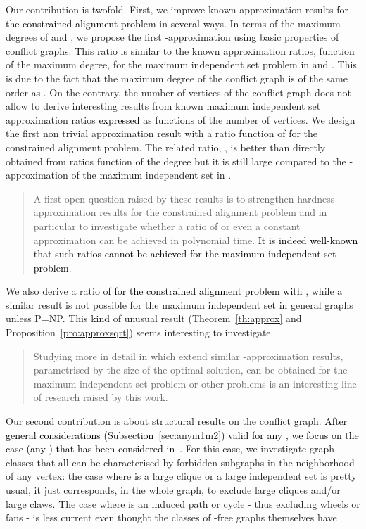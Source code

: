 \documentclass[final]{dmtcs-episciences}
\newcommand\mar[1]{\textcolor{black}{#1}}
\begin{document}
Our contribution is twofold. First, we improve known approximation results \mar{for the constrained alignment problem} in several ways.  In terms of the maximum degrees of  and ,  we propose the first -approximation using basic properties of conflict graphs. This ratio is similar to the known approximation ratios, function of the maximum degree, for the maximum independent set problem in  and . This is due to the fact that the maximum degree of the conflict graph is of the same order as . On the contrary, the number of vertices of the conflict graph does not allow to derive interesting results from known maximum independent set approximation ratios \mar{expressed as functions of} the number of vertices. We design the first non trivial approximation result with a ratio function of  for the constrained alignment problem.  The related ratio, , is better than  directly obtained from ratios function of the degree but it is still large compared to the -approximation of the maximum independent set in . 
\begin{quote}
A first open question raised by these results is 
to strengthen  hardness approximation results for the constrained alignment problem and in particular to investigate whether a ratio of  or even a constant approximation can be achieved in polynomial time. \mar{It is indeed well-known that such ratios cannot be achieved for the maximum independent set problem}.
\end{quote}
We also derive a ratio of  \mar{for the constrained alignment problem with }, while a similar result is not possible for the maximum independent set in general graphs unless P=NP. This kind of unusual result (Theorem~\ref{th:approx} and Proposition~\ref{pro:approxsqrt}) seems  interesting to investigate.
\begin{quote}
Studying more in detail in which extend similar -approximation results, parametrised by the size of the optimal solution,  can be obtained for the maximum independent set problem or other problems is  an interesting line of research raised by this work.\end{quote}
 Our second contribution is about structural results on the conflict graph. \mar{After general considerations (Subsection~\ref{sec:anym1m2}) valid for any , we focus on the case  (any ) that has been considered in~\cite{Fagnot2008,Fertin200990}}. For this case, we investigate graph classes that all can be characterised by forbidden subgraphs  in the neighborhood of any vertex: the case where  is a large clique or a large independent set is pretty usual, it just corresponds, in the whole graph, to  exclude large cliques and/or large claws. The case where  is an induced path or cycle \-- thus excluding wheels or fans \-- is less current even thought the classes of -free graphs themselves have 
\end{document}
